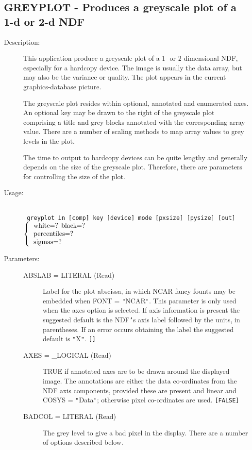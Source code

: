 \documentclass[twoside,11pt]{article}
\newcommand{\stardocinitials}  {SUN}
\newcommand{\stardocnumber}    {239.2}
\newcommand{\stardocname}{\stardocinitials /\stardocnumber}
\newcommand{\htmlref}[2]{#1}
\newcommand{\xlabel}[1]{}
\newlength{\sstbannerlength}
\newlength{\sstcaptionlength}
\newlength{\sstexampleslength}
\newlength{\sstexampleswidth}
\newcommand{\sstroutine}[3]{
   \goodbreak
   \markboth{{\stardocname}~ --- #1}{{\stardocname}~ --- #1}
   \rule{\textwidth}{0.5mm}
   \vspace{-7ex}
   \newline
   \settowidth{\sstbannerlength}{{\Large {\bf #1}}}
   \setlength{\sstcaptionlength}{\textwidth}
   \setlength{\sstexampleslength}{\textwidth}
   \addtolength{\sstbannerlength}{0.5em}
   \addtolength{\sstcaptionlength}{-2.0\sstbannerlength}
   \addtolength{\sstcaptionlength}{-4.9pt}
   \settowidth{\sstexampleswidth}{{\bf Examples:}}
   \addtolength{\sstexampleslength}{-\sstexampleswidth}
   \parbox[t]{\sstbannerlength}{\flushleft{\Large {\bf #1}}}
   \parbox[t]{\sstcaptionlength}{\center{\Large #2}}
   \parbox[t]{\sstbannerlength}{\flushright{\Large {\bf #1}}}
   \begin{description}
      #3
   \end{description}
}
\newcommand{\sstdescription}[1]{\item[Description:] #1}
\newcommand{\sstusage}[1]{\pagebreak[3] \item[Usage:] \mbox{} \\[1.3ex] {\ssttt #1}}
\newcommand{\sstparameters}[1]{
   \goodbreak 
   \item[Parameters:] \mbox{} \\
   \vspace{-3.5ex}
   \begin{description}
      #1
   \end{description}
}
\newcommand{\sstsubsection}[1]{ \item[{#1}] \mbox{} \\}
\newcommand{\ssttt}{\tt}
\renewcommand{\sstroutine}[3]{
      \subsection{#1\xlabel{#1}-\label{#1}#2}
      \begin{description}
         #3
      \end{description}
   }
\renewcommand{\sstdescription}[1]{\item[Description:]
      \begin{description}
         #1
      \end{description}
   }
\renewcommand{\sstusage}[1]{\htmlref{\item[Usage:]}{ap:usage} \mbox{} \\ {\ssttt #1}}
\renewcommand{\sstparameters}[1]{
      \htmlref{\item[Parameters:]}{se:param}
      \begin{description}
         #1
      \end{description}
   }
\renewcommand{\sstsubsection}[1]{\item[{#1}]}
\begin{document}
\sstroutine{
   GREYPLOT
}{
   Produces a greyscale plot of a 1-d or 2-d NDF
}{
   \sstdescription{
      This application produce a greyscale plot of a 1- or
      2-dimensional NDF, especially for a hardcopy device.  The image
      is usually the data array, but may also be the variance or
      quality.  The plot appears in the current graphics-database
      picture.

      The greyscale plot resides within optional, annotated and
      enumerated axes. An optional key may be drawn to the right of the
      greyscale plot comprising a title and grey blocks annotated with
      the corresponding array value.  There are a number of scaling
      methods to map array values to grey levels in the plot.

      The time to output to hardcopy devices can be quite lengthy
      and generally depends on the size of the greyscale plot.
      Therefore, there are parameters for controlling the size of
      the plot.
   }
   \sstusage{
      greyplot in [comp] key [device] mode [pxsize] [pysize] [out]
        \newline\hspace*{1.5em}
        $\left\{ {\begin{tabular}{l}
                    white=? black=? \\  
                    percentiles=? \\
                    sigmas=? 
                  \end{tabular} }
        \right.$
        \newline\hspace*{1.9em}
        \makebox[0mm][c]{\small mode}
   }
   \sstparameters{
      \sstsubsection{
         ABSLAB  =  LITERAL (Read)
      }{
         Label for the plot abscissa, in which NCAR fancy founts
         may be embedded when FONT = {\tt "}NCAR{\tt "}.  This parameter is only
         used when the axes option is selected.  If axis information is
         present the suggested default is the NDF{\tt '}s axis label followed
         by the units, in parentheses.  If an error occurs obtaining
         the label the suggested default is {\tt "}X{\tt "}. {\tt []}
      }
      \sstsubsection{
         AXES = \_LOGICAL (Read)
      }{
         TRUE if annotated axes are to be drawn around the displayed
         image.  The annotations are either the data co-ordinates from
         the NDF axis components, provided these are present and linear
         and COSYS = {\tt "}Data{\tt "}; otherwise pixel co-ordinates are used.
         {\tt [FALSE]}
      }
      \sstsubsection{
         BADCOL = LITERAL (Read)
      }{
         The grey level to give a bad pixel in the display.  There are
         a number of options described below.

}}}
\end{document}
